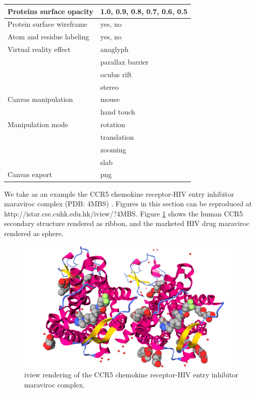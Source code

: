 \begin{table}
\begin{tabular}{ll}
\hline
 Proteins surface opacity & 1.0, 0.9, 0.8, 0.7, 0.6, 0.5\\
\hline
Protein surface wireframe & yes, no\\
\hline
Atom and residue labeling & yes, no\\
\hline
   Virtual reality effect & anaglyph\\
                          & parallax barrier\\
                          & oculus rift\\
                          & stereo\\
\hline
      Canvas manipulation & mouse\\
                          & hand touch\\
\hline
        Manipulation mode & rotation\\
                          & translation\\
                          & zooming\\
                          & slab\\
\hline
            Canvas export & png\\
\hline
\end{tabular}
\end{table}

We take as an example the CCR5 chemokine receptor-HIV entry inhibitor maraviroc complex (PDB: 4MBS) \citep{1348}. Figures in this section can be reproduced at http://istar.cse.cuhk.edu.hk/iview/?4MBS. Figure \ref{fig:ribbon} shows the human CCR5 secondary structure rendered as ribbon, and the marketed HIV drug maraviroc rendered as sphere.

\begin{figure}
\begin{center}
\includegraphics[width=\linewidth]{../iview/ribbon.png}
\end{center}
\caption{iview rendering of the CCR5 chemokine receptor-HIV entry inhibitor maraviroc complex.}
\label{fig:ribbon}
\end{figure}


